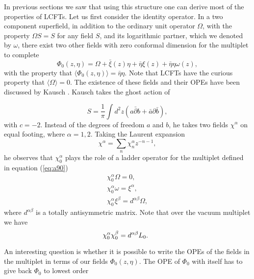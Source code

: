 \documentclass[a4paper,11pt]{article}
\begin{document}
In previous sections we saw that using this structure one can
derive most of the properties of LCFTs. Let us first consider the
identity operator. In a two component superfield, in addition to
the ordinary unit operator $\Omega$, with the property $\Omega S
= S$ for any field $S$, and its logarithmic partner, which we
denoted by $\omega$, there exist  two other fields with zero
conformal dimension for the multiplet to complete
\begin{equation}\label{eq:a90}
\Phi_0(z,\eta ) = \Omega  + \bar{\xi}(z) \eta +\bar{\eta}
\xi(z)+\bar{\eta} \eta \omega(z),
\end{equation}
with the property that $\langle\Phi_0(z,\eta)\rangle =\bar{\eta}
\eta$. Note that LCFTs have the curious property that $\langle
\Omega\rangle = 0$. The existence of these fields and their OPEs
have been discussed by Kausch \cite{kausch}. Kausch takes the
ghost action of

\begin{equation}\label{eq:a91}
S=\frac{1}{\pi}\int  d^{2}z
(a\bar{\partial}b+\bar{a}\partial\bar{b}),
\end{equation}
with $c=-2$. Instead of the degrees of freedom $a$ and $b$, he
takes two fields $\chi^{\alpha}$ on equal footing, where
$\alpha=1,2$. Taking the Laurent expansion
\begin{equation}\label{eq:a92}
\chi^\alpha =\sum_n \chi^{\alpha}_{n} z^{-n-1},
\end{equation}
he observes that $\chi^{\alpha}_{0}$ plays the role of a ladder
operator for the multiplet defined in equation (\ref{eq:a90})
\begin{eqnarray}\label{eq:a93}
\chi^{\alpha}_{0}\Omega=0, \nonumber\\
\chi^{\alpha}_{0}\omega=\xi^{\alpha},\nonumber\\
\chi^{\alpha}_{0}\xi^{\beta}=d^{\alpha\beta}\Omega,
\end{eqnarray}
 where $d^{\alpha\beta}$ is a totally antisymmetric matrix. Note
 that over the vacuum multiplet we have
\begin{equation}\label{eq:a96}
\chi^{\alpha}_{0}\chi^{\beta}_{0}=d^{\alpha\beta}L_0.\hspace{2mm}
\end{equation}

An interesting question is whether it is possible to write the
OPEs of the fields in the multiplet in terms of our fields $\Phi_0
(z,\eta)$. The OPE of $\Phi_0$ with itself has to give back
$\Phi_0$ to lowest order
\end{document}
